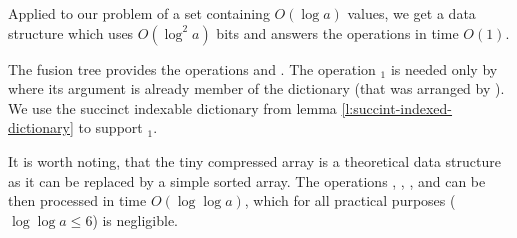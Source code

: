 Applied to our problem of a set containing $O(\log a)$ values, we get a data structure which uses $O(\log^2 a)$ bits and answers the operations in time $O(1)$.

\bigbreak

The fusion tree provides the operations \pred{} and \succ{}.
The operation \rank$_1$ is needed only by \elementIndex{} where its argument is already member of the dictionary (that was arranged by \succ{}).
We use the succinct indexable dictionary from lemma \ref{l:succint-indexed-dictionary} to support \rank$_1$.

\bigbreak

It is worth noting, that the tiny compressed array is a theoretical data structure as it can be replaced by a simple sorted array.
The operations \rank{}, \select{}, \pred{}, and \succ{} can be then processed in time $O(\log \log a)$, which for all practical purposes ($\log \log a \le 6$) is negligible.